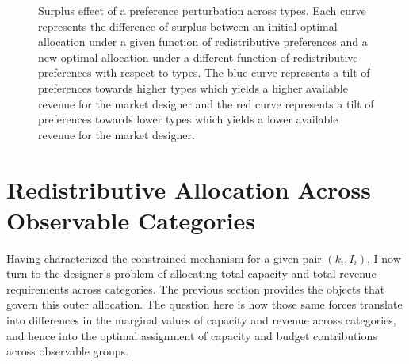 \documentclass{class}
\begin{document}
\begin{figure}[ht]
\centering
{}
\caption{Surplus effect of a preference perturbation across types. Each curve represents the difference of surplus between an initial optimal allocation under a given function of redistributive preferences and a new optimal allocation under a different function of redistributive preferences with respect to types. The blue curve represents a tilt of preferences towards higher types which yields a higher available revenue for the market designer and the red curve represents a tilt of preferences towards lower types which yields a lower available revenue for the market designer.}
\label{fig:surplus-redist}
\end{figure}


\section{Redistributive Allocation Across Observable Categories}\label{sec:across}

Having characterized the constrained mechanism for a given pair $(k_i,I_i)$, I now turn to the designer's problem of allocating total capacity and total revenue requirements across categories. The previous section provides the objects that govern this outer allocation. The question here is how those same forces translate into differences in the marginal values of capacity and revenue across categories, and hence into the optimal assignment of capacity and budget contributions across observable groups.
\end{document}
